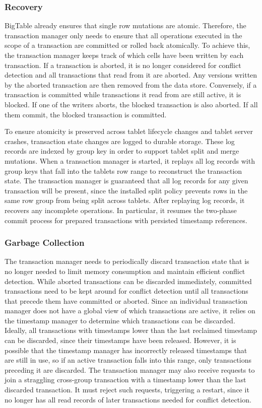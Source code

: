 \documentclass[10pt,final,journal]{IEEEtran}
\begin{document}
\subsubsection{Recovery}
BigTable already ensures that single row mutations are atomic. Therefore, the transaction manager only needs to ensure that all operations executed in the scope of a transaction are committed or rolled back atomically. To achieve this, the transaction manager keeps track of which cells have been written by each transaction. If a transaction is aborted, it is no longer considered for conflict detection and all transactions that read from it are aborted. Any versions written by the aborted transaction are then removed from the data store. Conversely, if a transaction is committed while transactions it read from are still active, it is blocked. If one of the writers aborts, the blocked transaction is also aborted. If all them commit, the blocked transaction is committed.

To ensure atomicity is preserved across tablet lifecycle changes and tablet server crashes, transaction state changes are logged to durable storage. These log records are indexed by group key in order to support tablet split and merge mutations. When a transaction manager is started, it replays all log records with group keys that fall into the tablets row range to reconstruct the transaction state. The transaction manager is guaranteed that all log records for any given transaction will be present, since the installed split policy prevents rows in the same row group from being split across tablets. After replaying log records, it recovers any incomplete operations. In particular, it resumes the two-phase commit process for prepared transactions with persisted timestamp references.

\subsubsection{Garbage Collection}
The transaction manager needs to periodically discard transaction state that is no longer needed to limit memory consumption and maintain efficient conflict detection. While aborted transactions can be discarded immediately, committed transactions need to be kept around for conflict detection until all transactions that precede them have committed or aborted. Since an individual transaction manager does not have a global view of which transactions are active, it relies on the timestamp manager to determine which transactions can be discarded. Ideally, all transactions with timestamps lower than the last reclaimed timestamp can be discarded, since their timestamps have been released. However, it is possible that the timestamp manager has incorrectly released timestamps that are still in use, so if an active transaction falls into this range, only transactions preceding it are discarded. The transaction manager may also receive requests to join a straggling cross-group transaction with a timestamp lower than the last discarded transaction. It must reject such requests, triggering a restart, since it no longer has all read records of later transactions needed for conflict detection.
\end{document}

